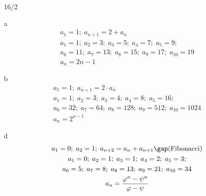 \begin{exercise}{16/2}
  \item [a]
  \begin{gather*}
    a_1 = 1;\; a_{n + 1} = 2 + a_n \\
    a_1 = 1;\; a_2 = 3;\; a_3 = 5;\; a_4 = 7;\; a_5 = 9;\\
    a_6 = 11;\; a_7 = 13;\; a_8 = 15;\; a_9 = 17;\; a_{10} = 19\\
    a_n = 2n - 1
  \end{gather*}
  \item [b]
  \begin{gather*}
    a_1 = 1;\; a_{n + 1} = 2 \cdot a_n \\
    a_1 = 1;\; a_2 = 3;\; a_3 = 4;\; a_4 = 8;\; a_5 = 16;\\
    a_6 = 32;\; a_7 = 64;\; a_8 = 128;\; a_9 = 512;\; a_{10} = 1024\\
    a_n = 2^{n - 1}
  \end{gather*}
  \item [d]
  \begin{gather*}
    a_1 = 0;\; a_2 = 1;\; a_{n + 2} = a_n + a_{n + 1}\gap \text{(Fibonacci)} \\
    a_1 = 0;\; a_2 = 1;\; a_3 = 1;\; a_4 = 2;\; a_5 = 3;\\
    a_6 = 5;\; a_7 = 8;\; a_8 = 13;\; a_9 = 21;\; a_{10} = 34\\
    a_n = \frac{\varphi^n - \psi^n}{\varphi - \psi}
  \end{gather*}
\end{exercise}
